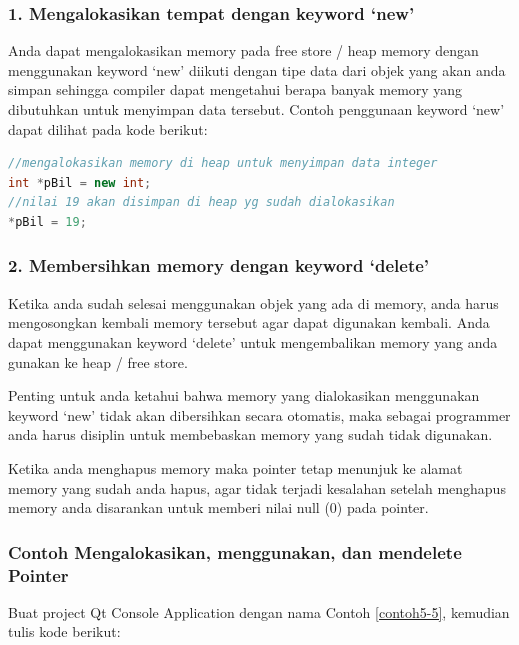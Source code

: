 \subsubsection{\texorpdfstring{1. Mengalokasikan tempat dengan keyword
`new'}{Mengalokasikan tempat dengan keyword new}}\label{mengalokasikan-tempat-dengan-keyword-new}

Anda dapat mengalokasikan memory pada free store / heap memory dengan
menggunakan keyword `new' diikuti dengan tipe data dari objek yang akan
anda simpan sehingga compiler dapat mengetahui berapa banyak memory yang
dibutuhkan untuk menyimpan data tersebut. Contoh penggunaan keyword
`new' dapat dilihat pada kode berikut:

\begin{lstlisting}[language=c++, numbers=none]
//mengalokasikan memory di heap untuk menyimpan data integer
int *pBil = new int;
//nilai 19 akan disimpan di heap yg sudah dialokasikan
*pBil = 19;
\end{lstlisting}

\subsubsection{\texorpdfstring{2. Membersihkan memory dengan keyword
`delete'}{Membersihkan memory dengan keyword delete}}\label{membersihkan-memory-dengan-keyword-delete}

Ketika anda sudah selesai menggunakan objek yang ada di memory, anda
harus mengosongkan kembali memory tersebut agar dapat digunakan kembali.
Anda dapat menggunakan keyword `delete' untuk mengembalikan memory yang
anda gunakan ke heap / free store.

Penting untuk anda ketahui bahwa memory yang dialokasikan menggunakan
keyword `new' tidak akan dibersihkan secara otomatis, maka sebagai
programmer anda harus disiplin untuk membebaskan memory yang sudah tidak
digunakan.

Ketika anda menghapus memory maka pointer tetap menunjuk ke alamat
memory yang sudah anda hapus, agar tidak terjadi kesalahan setelah
menghapus memory anda disarankan untuk memberi nilai null (0) pada
pointer.

\subsubsection*{Contoh  Mengalokasikan, menggunakan, dan mendelete Pointer}

Buat project Qt Console Application dengan nama Contoh \ref{contoh5-5}, kemudian tulis
kode berikut:

